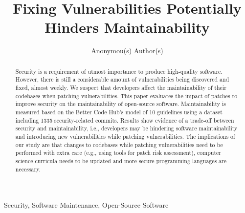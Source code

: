 \documentclass[10pt,conference]{IEEEtran}
\begin{document}
\title{Fixing Vulnerabilities Potentially Hinders Maintainability}


\author{
    Anonymou(s) Author(s)

}

\maketitle

\begin{abstract}
Security is a requirement of utmost importance to produce high-quality software. 
However, there is still a considerable amount of 
vulnerabilities being discovered and fixed, almost weekly. We suspect that developers 
affect the maintainability of their codebases when patching vulnerabilities. This paper evaluates the 
impact of patches to improve security on the maintainability of open-source 
software. Maintainability is measured based on the Better Code Hub’s model of 10 
guidelines using a dataset including 1335 security-related commits.
Results show evidence of a trade-off between security and maintainability, i.e., 
developers may be hindering software maintainability and introducing 
new vulnerabilities while patching vulnerabilities.
The implications of our study are that changes to codebases while patching 
vulnerabilities need to be performed with extra care (e.g., using tools
for patch risk assessment), computer science
curricula needs to be updated and more secure programming languages are necessary.
\end{abstract}
\begin{IEEEkeywords}
Security, Software Maintenance, Open-Source Software
\end{IEEEkeywords}
\end{document}
